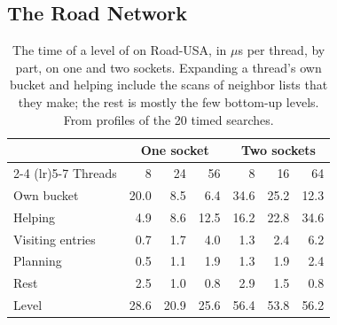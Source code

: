 \subsection{The Road Network}
\label{sec:exp-road}

\begin{table}
    \caption{The time of a level of \wfdo on Road-USA, in $\mu$s per thread, by part, on one and two sockets. Expanding a thread's own bucket and helping include the scans of neighbor lists that they make; the rest is mostly the few bottom-up levels. From profiles of the 20 timed searches.}
    \label{tab:road}
    \small
    \setlength{\tabcolsep}{4pt}
    \begin{tabular}{l r r r r r r}
        \toprule
        & \multicolumn{3}{c}{One socket} & \multicolumn{3}{c}{Two sockets} \\
        \cmidrule(lr){2-4} \cmidrule(lr){5-7}
        Threads & 8 & 24 & 56 & 8 & 16 & 64 \\
        \midrule
        Own bucket & 20.0 & 8.5 & 6.4 & 34.6 & 25.2 & 12.3 \\
        Helping & 4.9 & 8.6 & 12.5 & 16.2 & 22.8 & 34.6 \\
        Visiting entries & 0.7 & 1.7 & 4.0 & 1.3 & 2.4 & 6.2 \\
        Planning & 0.5 & 1.1 & 1.9 & 1.3 & 1.9 & 2.4 \\
        Rest & 2.5 & 1.0 & 0.8 & 2.9 & 1.5 & 0.8 \\
        \midrule
        Level & 28.6 & 20.9 & 25.6 & 56.4 & 53.8 & 56.2 \\
        \bottomrule
    \end{tabular}
\end{table}

